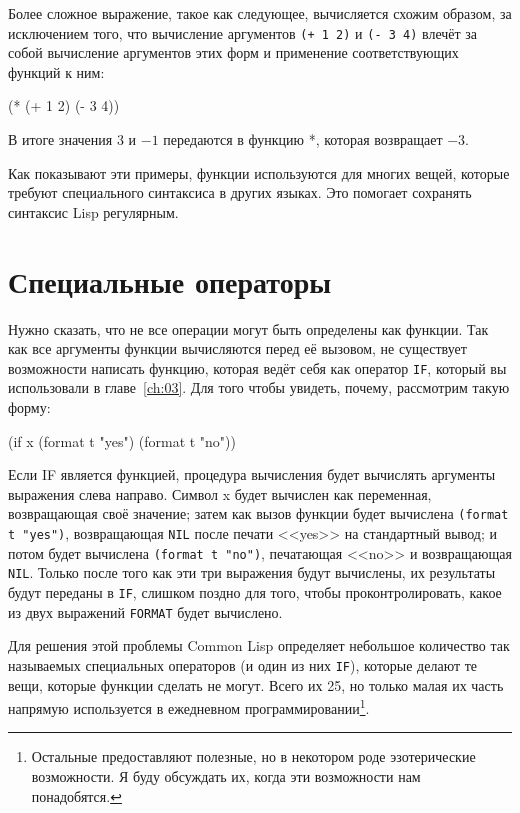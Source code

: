 Более сложное выражение, такое как следующее, вычисляется схожим образом, за исключением
того, что вычисление аргументов \lstinline{(+ 1 2)} и \lstinline{(- 3 4)} влечёт за собой
вычисление аргументов этих форм и применение соответствующих функций к ним:

\begin{myverb}
  (* (+ 1 2) (- 3 4))
\end{myverb}

В итоге значения $3$ и $-1$ передаются в функцию *, которая возвращает $-3$.

Как показывают эти примеры, функции используются для многих вещей, которые требуют
специального синтаксиса в других языках. Это помогает сохранять синтаксис Lisp регулярным.

\section{Специальные операторы}

Нужно сказать, что не все операции могут быть определены как функции. Так как все
аргументы функции вычисляются перед её вызовом, не существует возможности написать
функцию, которая ведёт себя как оператор \lstinline{IF}, который вы использовали в
главе~\ref{ch:03}. Для того чтобы увидеть, почему, рассмотрим такую форму:

\begin{myverb}
  (if x (format t "yes") (format t "no"))
\end{myverb}

Если IF является функцией, процедура вычисления будет вычислять аргументы выражения слева
направо. Символ x будет вычислен как переменная, возвращающая своё значение; затем как
вызов функции будет вычислена \lstinline{(format t "yes")}, возвращающая \lstinline{NIL} после
печати <<yes>> на стандартный вывод; и потом будет вычислена \lstinline{(format t "no")}, печатающая
<<no>> и возвращающая \lstinline{NIL}. Только после того как эти три выражения будут
вычислены, их результаты будут переданы в \lstinline{IF}, слишком поздно для того, чтобы
проконтролировать, какое из двух выражений \lstinline{FORMAT} будет вычислено.

Для решения этой проблемы Common Lisp определяет небольшое количество так называемых
специальных операторов (и один из них \lstinline{IF}), которые делают те вещи, которые
функции сделать не могут. Всего их 25, но только малая их часть напрямую используется в
ежедневном программировании\footnote{Остальные предоставляют полезные, но в некотором роде
  эзотерические возможности. Я буду обсуждать их, когда эти возможности нам понадобятся.}.

